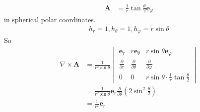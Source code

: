 \documentclass[a4paper]{article}
\begin{document}
\begin{eg}
\begin{equation*}
\begin{aligned}
\mathbf{A} &= \frac{1}{r}\tan\frac{\theta}{2}\mathbf{e}_\varphi
\end{aligned}
\end{equation*}
in spherical polar coordinates.
\begin{equation*}
\begin{aligned}
h_r = 1, h_\theta = 1, h_\varphi = r\sin\theta
\end{aligned}
\end{equation*}
So
\begin{equation*}
\begin{aligned}
\nabla\times\mathbf{A} &= \frac{1}{r^2 \sin\theta}
\begin{vmatrix}
\mathbf{e}_r & r\mathbf{e}_\theta & r\sin\theta\mathbf{e}_\varphi\\
\frac{\partial}{\partial r} & \frac{\partial}{\partial \theta} & \frac{\partial}{\partial \varphi}\\
0 & 0 & r\sin\theta \cdot \frac{1}{r} \tan \frac{\theta}{2}
\end{vmatrix}\\
&= \frac{1}{r^2 \sin\theta} \mathbf{e}_r \frac{\partial}{\partial \theta} \left(2 \sin^2 \frac{\theta}{2}\right)\\
&= \frac{1}{r^2} \mathbf{e}_r
\end{aligned}
\end{equation*}
\end{eg}
\end{document}
